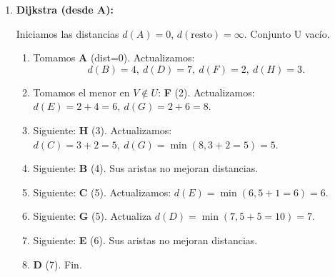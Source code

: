 \documentclass[12pt]{article}
\begin{document}
\begin{enumerate}
\begin{enumerate}[label=\alph*)]
                \textbf{Árbol resultante:}
                \[
                \begin{tikzpicture}[
                    main/.style = {draw=black, circle, minimum size=8mm, inner sep=1pt, font=\bfseries}
                ]
                    \node[main] (A) at (0,0) {A};
                    \node[main] (B) at (2,1.5) {B};
                    \node[main] (C) at (4,0) {C};
                    \node[main] (E) at (5,-2) {E};
                    \node[main] (F) at (0,-2) {F};
                    \node[main] (H) at (2,-1) {H};
                    \node[main] (G) at (4,-3) {G};
                    \node[main] (D) at (2,-3) {D};

                    \draw (A) -- node[left] {2} (F);
                    \draw (A) -- node[above] {3} (H);
                    \draw (A) -- node[left, yshift=0.5em] {4} (B);
                    \draw (C) -- node[right] {1} (E);
                    \draw (C) -- node[above] {2} (H);
                    \draw (G) -- node[above] {2} (H);
                    \draw (D) -- node[above, yshift=-0.6em, xshift=-2em] {3} (E);
                \end{tikzpicture}
                \]

                \item \textbf{Dijkstra (desde A):}

                Iniciamos las distancias \(d(A)=0\), \(d(\text{resto})=\infty\). Conjunto U vacío.

                \begin{enumerate}[label=\arabic*.]
                    \item Tomamos \textbf{A} (dist=0). Actualizamos:
                    \[d(B)=4,\ d(D)=7,\ d(F)=2,\ d(H)=3.\]
                    \item Tomamos el menor en \(V \notin     U\): \textbf{F} (2). Actualizamos: \(d(E)=2+4=6,\ d(G)=2+6=8.\)
                    \item Siguiente: \textbf{H} (3). Actualizamos:\(d(C)=3+2=5,\ d(G)=\min(8,3+2=5)=5.\)
                    \item Siguiente: \textbf{B} (4). Sus aristas no mejoran distancias.
                    \item Siguiente: \textbf{C} (5). Actualizamos: \(d(E)=\min(6,5+1=6)=6.\)
                    \item Siguiente: \textbf{G} (5). Actualiza \(d(D)=\min(7,5+5=10)=7.\)
                    \item Siguiente: \textbf{E} (6). Sus aristas no mejoran distancias.
                    \item \textbf{D} (7). Fin.
                \end{enumerate}


\end{enumerate}
\end{enumerate}
\end{document}
